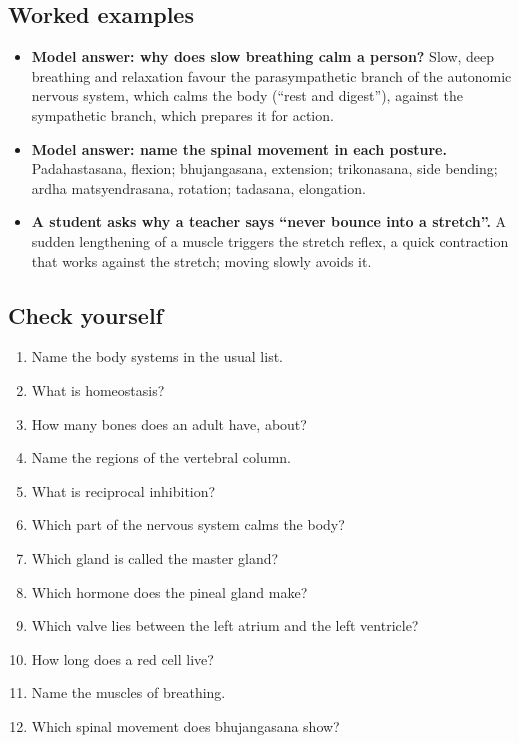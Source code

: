 \subsection*{Worked examples}
\begin{itemize}
\item \textbf{Model answer: why does slow breathing calm a person?} Slow, deep breathing and relaxation favour the parasympathetic branch of the autonomic nervous system, which calms the body (``rest and digest''), against the sympathetic branch, which prepares it for action.
\item \textbf{Model answer: name the spinal movement in each posture.} Padahastasana, flexion; bhujangasana, extension; trikonasana, side bending; ardha matsyendrasana, rotation; tadasana, elongation.
\item \textbf{A student asks why a teacher says ``never bounce into a stretch''.} A sudden lengthening of a muscle triggers the stretch reflex, a quick contraction that works against the stretch; moving slowly avoids it.
\end{itemize}

\subsection*{Check yourself}
\begin{enumerate}
\item Name the body systems in the usual list.
\item What is homeostasis?
\item How many bones does an adult have, about?
\item Name the regions of the vertebral column.
\item What is reciprocal inhibition?
\item Which part of the nervous system calms the body?
\item Which gland is called the master gland?
\item Which hormone does the pineal gland make?
\item Which valve lies between the left atrium and the left ventricle?
\item How long does a red cell live?
\item Name the muscles of breathing.
\item Which spinal movement does bhujangasana show?
\end{enumerate}

